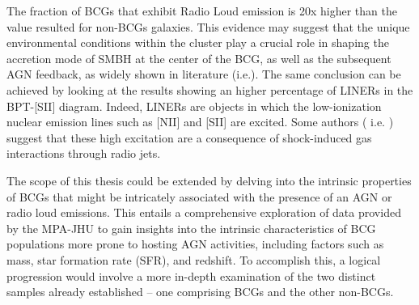 The fraction of BCGs that exhibit Radio Loud emission is 20x higher than the value resulted for non-BCGs galaxies.
This evidence may suggest that the unique environmental conditions within the cluster play a crucial role in shaping the accretion mode of SMBH at the center of the BCG, as well as the subsequent AGN feedback, as widely shown in literature (i.e.\cite{2019ApJ...883..193N, 2021A&A...649A..23C}).
The same conclusion can be achieved by looking at the results showing an higher percentage of LINERs in the BPT-[SII] diagram. Indeed, LINERs are objects in which the low-ionization nuclear emission lines such as [NII] and [SII] are excited. Some authors ( i.e. \cite{Fabbiano_2022}) suggest that these high excitation are a consequence of shock-induced gas interactions through radio jets.

The scope of this thesis could be extended by delving into the intrinsic properties of BCGs that might be intricately associated with the presence of an AGN or radio loud emissions. This entails a comprehensive exploration of data provided by the MPA-JHU to gain insights into the intrinsic characteristics of BCG populations more prone to hosting AGN activities, including factors such as mass, star formation rate (SFR), and redshift. To accomplish this, a logical progression would involve a more in-depth examination of the two distinct samples already established – one comprising BCGs and the other non-BCGs.

\begin{comment}
Lascio a te scrivere per bene la parte di prospettive future su questa linea di ricerca. Io qui ti faccio un discorsetto in italiano, tu riportalo per bene a modo tuo.
Ora abbiamo visto se le BCG hanno una significativa differenza in frazione di AGN rispetto alle non BCG giusto? E al momento quello che possiamo fare è semplicemente ipotizzare che queste differenze siano guidate dai differenti processi evolutivi delle BCG, a loro volta come conseguenza del fatto che queste si trovano alcentro di overdensity, in cui gas accretion dal cosmic web e merger activity sono all’ordine del giorno. 

Tuttavia sarebbe interessante capire se ci sono proprietà specifiche di queste BCG, che sono correlate con la presenza di un AGN o di un’emissione radio.  Per fare ciò abbiamo altre proprietà derivate dal team XX (gli stessi che ti danno i redshifts e le emissioni in riga), che possono essere utilizzate per avere una view del tipo di proprietà che ha la popolazione più incline ad avere un attività di AGN (Massa, SFR, Z, sigma della riga). Quindi in futuro sarà importante investigare eventuali correlazioni, come già è stato fatto in altri lavori (cercateli), però in questo caso andiamo a studiare le correlazioni in funzione della selezione che abbiamo di BCG e non-BCG. (ps- questi subsamples sono in sè già una selezione in Massa e Environment, perché ovviamente le BCG saranno le galassie più massicce in regioni dense).
Detto ciò vedi quello che puoi scrivere.
Buona conclusione.
\end{comment}



